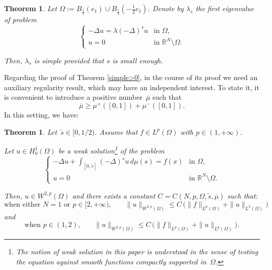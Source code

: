\documentclass[12pt,a4paper,intlimits,sumlimits]{amsart}
\def \R {\mathbb{R}}
\theoremstyle{definition}
\theoremstyle{plain}
\newtheorem{theorem}[definition]{Theorem}
\numberwithin{equation}{section}
\renewcommand{\leq}{\leqslant}
\renewcommand{\ge}{\geqslant}
\begin{document}
\begin{theorem}\label{lambdassemplice}
Let $\Omega:=B_\frac{1}{2}(e_1)\cup B_\frac{1}{4}(-\frac{1}{2}e_1)$. Denote by $\lambda_s$ the first eigenvalue of problem
\[
\begin{cases}
-\Delta u=\lambda (-\Delta)^s u &\mbox{in }\Omega,
\\
u=0  &\mbox{in }\R^N\setminus \Omega.
\end{cases}
\]

Then, $\lambda_s$ is simple provided that $s$ is small enough.
\end{theorem}

Regarding the proof of Theorem \ref{simple>0}, 
in the course of its proof
we need
an auxiliary regularity result, which may have an independent interest.
To state it, it is convenient to introduce a positive number~$\overline\mu$ such that
$$\overline\mu\ge \mu^+([0,1])+\mu^-([0,1]).$$
In this setting, we have:

\begin{theorem}\label{thmregolarità}
Let~$\widetilde s\in[0,1/2)$.
Assume that $f\in L^p(\Omega)$ with $p\in(1,+\infty)$. 

Let $u\in H^1_0(\Omega)$ be a weak solution\footnote{The notion of weak solution in this paper is understood in the sense of testing the equation against smooth functions compactly supported in~$\Omega$.} of the problem
\begin{equation}\label{problemaregolarità}
\begin{cases}
-\Delta u +\displaystyle\int_{[0,\widetilde s]}(-\Delta)^s u\,d\mu(s)
=f(x) & \mbox{in } \Omega,
\\
u=0  & \mbox{in } \R^N\setminus \Omega.
\end{cases}
\end{equation}

Then, $u\in W^{2,p}(\Omega)$ and there exists a constant $C=C(N,p,\Omega,\widetilde s,\overline\mu)$ such that:
\begin{equation}\label{inequalityregolarità}
{\mbox{when either $N=1$ or $p\in[2,+\infty)$,}}\qquad
\|u\|_{W^{2,p}(\Omega)}\leq 
C\,\Big( \|f\|_{L^p(\Omega)}+\|u\|_{L^2(\Omega)}\Big)
\end{equation}
and
\begin{equation}\label{inequalityregolaritàlow}
{\mbox{when $p\in(1,2)$,}}\qquad
\|u\|_{W^{2,p}(\Omega)}\leq 
C\,\Big( \|f\|_{L^p(\Omega)}+\|u\|_{L^p(\Omega)}\Big).
\end{equation}
\end{theorem}
\end{document}
